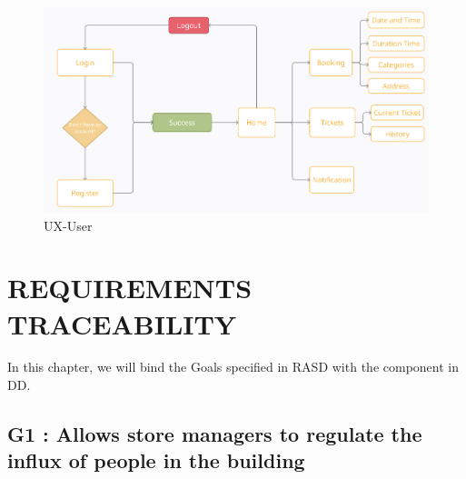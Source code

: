 \documentclass[a4paper,12pt]{report}
\begin{document}
\begin{figure}[H]
	\centering
	\includegraphics[scale=0.5]{UX-User}
	\caption{UX-User}
	\centering
	\label{fig:ux-user}
\end{figure}



\chapter{REQUIREMENTS TRACEABILITY}\label{ch:requirements-traceability}

In this chapter, we will bind the Goals specified in RASD with the component in DD.

\section{G1 : Allows store managers to regulate the influx of people in the building}
\end{document}
